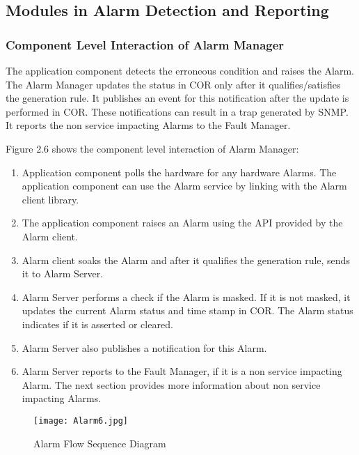 \begin{flushleft}
\newpage
\subsection{Modules in Alarm Detection and Reporting}

\subsubsection{Component Level Interaction of Alarm Manager}

The application component detects the erroneous condition and raises the Alarm. The Alarm Manager updates the status in COR only after it 
qualifies/satisfies the generation rule. It publishes an event for this notification after the update is performed in COR. These notifications can result
in a trap generated by SNMP. It reports the non service impacting Alarms to the Fault Manager.  

Figure 2.6 shows the component level interaction of Alarm Manager:
\begin{enumerate}
	\item
Application component polls the hardware for any hardware Alarms. The application component can use the Alarm service by linking with the Alarm 
client library. 
\item
The application component raises an Alarm using the API provided by the Alarm client. 
\item
Alarm client soaks the Alarm and after it qualifies the generation rule, sends it to Alarm Server. 
\item
Alarm Server performs a check if the Alarm is masked. If it is not masked, it updates the current Alarm status and time stamp in COR. The Alarm
status indicates if it is asserted or cleared. 
\item
Alarm Server also publishes a notification for this Alarm.
\item
Alarm Server reports to the Fault Manager, if it is a non service impacting Alarm. The next section provides more information about non service impacting
Alarms.
	\end{enumerate}
\end{flushleft}
\begin{figure}
\begin{center}
\texttt{[image: Alarm6.jpg]}
\end{center}
\caption{Alarm Flow Sequence Diagram}
\end{figure}
